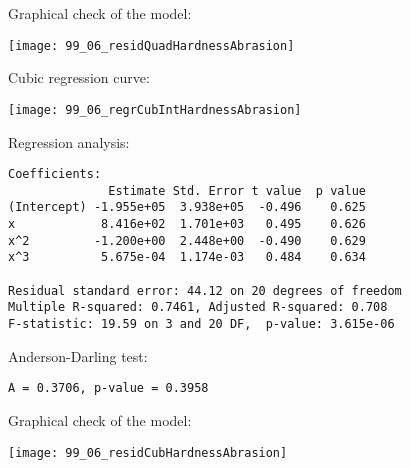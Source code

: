 \begin{frame}
  Graphical check of the model:\\
  \vspace{.3cm}
  \begin{center}
    \texttt{[image: 99\_06\_residQuadHardnessAbrasion]}
  \end{center}
\end{frame}

\begin{frame}
  Cubic regression curve:\\
  \vspace{.3cm}
  \begin{center}
    \texttt{[image: 99\_06\_regrCubIntHardnessAbrasion]}
  \end{center}
\end{frame}

\begin{frame}[fragile]
  Regression analysis:\\
  \begin{small}
    \begin{verbatim}
Coefficients:
              Estimate Std. Error t value  p value
(Intercept) -1.955e+05  3.938e+05  -0.496    0.625
x            8.416e+02  1.701e+03   0.495    0.626
x^2         -1.200e+00  2.448e+00  -0.490    0.629
x^3          5.675e-04  1.174e-03   0.484    0.634

Residual standard error: 44.12 on 20 degrees of freedom
Multiple R-squared: 0.7461,	Adjusted R-squared: 0.708 
F-statistic: 19.59 on 3 and 20 DF,  p-value: 3.615e-06 
    \end{verbatim}
  \end{small}
  Anderson-Darling test:\\
  \begin{small}
    \begin{verbatim}
A = 0.3706, p-value = 0.3958
    \end{verbatim}
  \end{small}
\end{frame}

\begin{frame}
  Graphical check of the model:\\
  \vspace{.3cm}
  \begin{center}
    \texttt{[image: 99\_06\_residCubHardnessAbrasion]}
  \end{center}
\end{frame}

